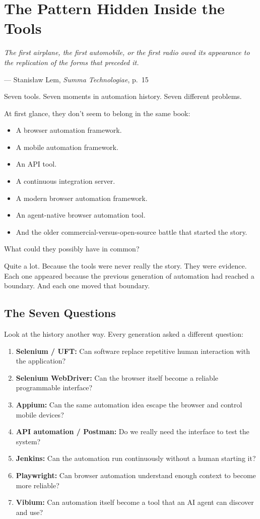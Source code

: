 \documentclass[11pt,twoside]{book}
\providecommand{\epigraphlem}[2]{%
  \begin{flushright}\begin{minipage}{0.72\textwidth}\raggedleft
  \itshape #1\par\vspace{0.4em}\normalfont\small --- #2
  \end{minipage}\end{flushright}\vspace{1.2em}}
\begin{document}
\chapter{The Pattern Hidden Inside the Tools}

\epigraphlem{The first airplane, the first automobile, or the first radio owed its appearance to the replication of the forms that preceded it.}{Stanisław Lem, \textit{Summa Technologiae}, p.~15}


Seven tools.
Seven moments in automation history.
Seven different problems.

At first glance, they don't seem to belong in the same book:
\begin{itemize}[nosep]
    \item A browser automation framework.
    \item A mobile automation framework.
    \item An API tool.
    \item A continuous integration server.
    \item A modern browser automation framework.
    \item An agent-native browser automation tool.
    \item And the older commercial-versus-open-source battle that started the story.
\end{itemize}

What could they possibly have in common?

Quite a lot. Because the tools were never really the story. They were evidence. Each one appeared because the previous generation of automation had reached a boundary. And each one moved that boundary.

\section*{The Seven Questions}

Look at the history another way. Every generation asked a different question:

\begin{enumerate}
    \item \textbf{Selenium / UFT:} Can software replace repetitive human interaction with the application?
    \item \textbf{Selenium WebDriver:} Can the browser itself become a reliable programmable interface?
    \item \textbf{Appium:} Can the same automation idea escape the browser and control mobile devices?
    \item \textbf{API automation / Postman:} Do we really need the interface to test the system?
    \item \textbf{Jenkins:} Can the automation run continuously without a human starting it?
    \item \textbf{Playwright:} Can browser automation understand enough context to become more reliable?
    \item \textbf{Vibium:} Can automation itself become a tool that an AI agent can discover and use?
\end{enumerate}
\end{document}
